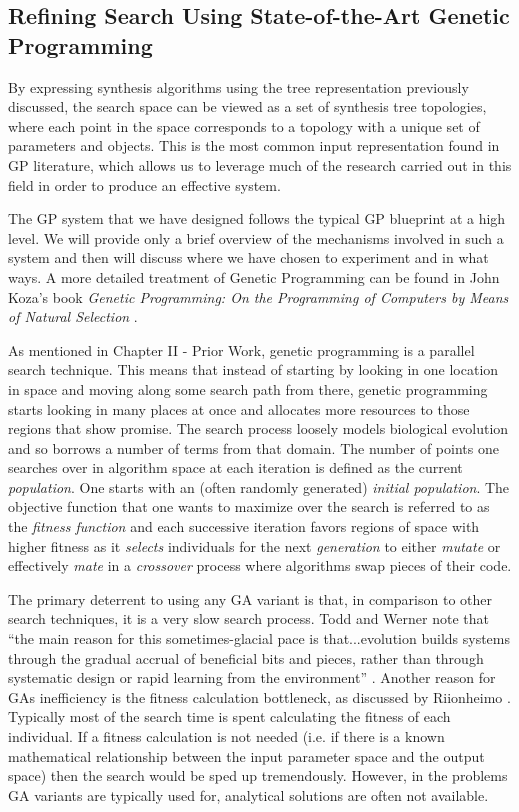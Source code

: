 \documentclass[12pt]{report} 	%
\numberwithin{figure}{chapter}
\numberwithin{table}{chapter}
\numberwithin{equation}{chapter}
\begin{document}
\begin{flushleft}
\vspace{12pt}\section{Refining Search Using State-of-the-Art Genetic Programming}
By expressing synthesis algorithms using the tree representation previously discussed, the search space can be viewed as a set of synthesis tree topologies, where each point in the space corresponds to a topology with a unique set of parameters and objects. This is the most common input representation found in GP literature, which allows us to leverage much of the research carried out in this field in order to produce an effective system.

The GP system that we have designed follows the typical GP blueprint at a high level. We will provide only a brief overview of the mechanisms involved in such a system and then will discuss where we have chosen to experiment and in what ways. A more detailed treatment of Genetic Programming can be found in John Koza's book \textit{Genetic Programming: On the Programming of Computers by Means of Natural Selection} \cite{Koza:1992gp}.

As mentioned in Chapter II - Prior Work, genetic programming is a parallel search technique. This means that instead of starting by looking in one location in space and moving along some search path from there, genetic programming starts looking in many places at once and allocates more resources to those regions that show promise. The search process loosely models biological evolution and so borrows a number of terms from that domain. The number of points one searches over in algorithm space at each iteration is defined as the current \textit{population}. One starts with an (often randomly generated) \textit{initial population}. The objective function that one wants to maximize over the search is referred to as the \textit{fitness function} and each successive iteration favors regions of space with higher fitness as it \textit{selects} individuals for the next \textit{generation} to either \textit{mutate} or effectively \textit{mate} in a  \textit{crossover} process where algorithms swap pieces of their code.

The primary deterrent to using any GA variant is that, in comparison to other search techniques, it is a very slow search process. Todd and Werner note that ``the main reason for this sometimes-glacial pace is that...evolution builds systems through the gradual accrual of beneficial bits and pieces, rather than through systematic design or rapid learning from the environment'' \cite[p. 5]{Todd:1998tg}. Another reason for GAs inefficiency is the fitness calculation bottleneck, as discussed by Riionheimo \cite[p.10]{Riionheimo:2003qo}. Typically most of the search time is spent calculating the fitness of each individual. If a fitness calculation is not needed (i.e. if there is a known mathematical relationship between the input parameter space and the output space) then the search would be sped up tremendously. However, in the problems GA variants are typically used for, analytical solutions are often not available.


\end{flushleft}
\end{document}
